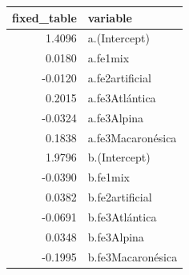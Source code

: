 \begin{table}[ht]
\centering
\begin{tabular}{rl}
  \hline
fixed\_table & variable \\ 
  \hline
1.4096 & a.(Intercept) \\ 
  0.0180 & a.fe1mix \\ 
  -0.0120 & a.fe2artificial \\ 
  0.2015 & a.fe3Atlántica \\ 
  -0.0324 & a.fe3Alpina \\ 
  0.1838 & a.fe3Macaronésica \\ 
  1.9796 & b.(Intercept) \\ 
  -0.0390 & b.fe1mix \\ 
  0.0382 & b.fe2artificial \\ 
  -0.0691 & b.fe3Atlántica \\ 
  0.0348 & b.fe3Alpina \\ 
  -0.1995 & b.fe3Macaronésica \\ 
   \hline
\end{tabular}
\end{table}
